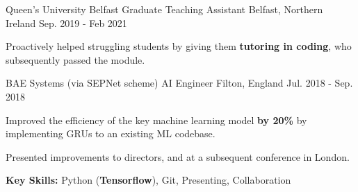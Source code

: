 \begin{cventries}
    
  \cventry
  	{Queen's University Belfast} %
    {Graduate Teaching Assistant} %
    {Belfast, Northern Ireland} %
    {Sep. 2019 - Feb 2021} %
    {
      \begin{cvitems} %
        \item {Proactively helped struggling students by giving them \textbf{tutoring in coding}, who subsequently passed the module.}
      \end{cvitems}
    }


  \cventry
  	{BAE Systems (via SEPNet scheme)} %
    {AI Engineer} %
    {Filton, England} %
    {Jul. 2018 - Sep. 2018} %
    {
      \begin{cvitems} %
        \item {Improved the efficiency of the key machine learning model \textbf{by 20\%} by implementing GRUs to an existing ML codebase.}
        \item {Presented improvements to directors, and at a subsequent conference in London.}
        \item {\textbf{Key Skills:} Python (\textbf{Tensorflow}), Git, Presenting, Collaboration}
      \end{cvitems}
    }


\end{cventries}


